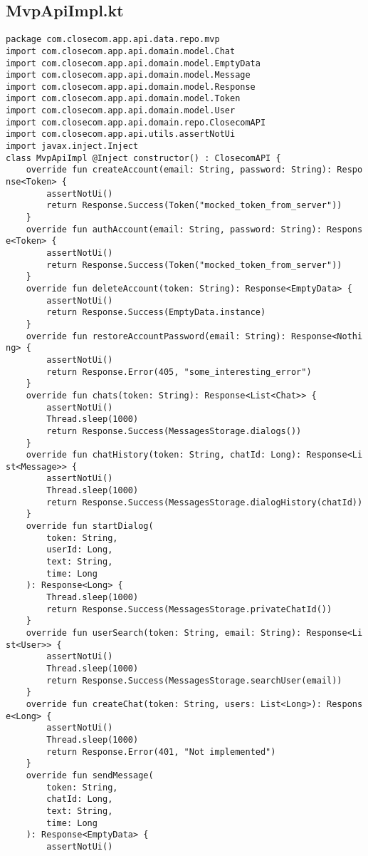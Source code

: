 \documentclass[listing]{espd}
\begin{document}
\subsection{MvpApiImpl.kt}
\begin{verbatim}
package com.closecom.app.api.data.repo.mvp
import com.closecom.app.api.domain.model.Chat
import com.closecom.app.api.domain.model.EmptyData
import com.closecom.app.api.domain.model.Message
import com.closecom.app.api.domain.model.Response
import com.closecom.app.api.domain.model.Token
import com.closecom.app.api.domain.model.User
import com.closecom.app.api.domain.repo.ClosecomAPI
import com.closecom.app.api.utils.assertNotUi
import javax.inject.Inject
class MvpApiImpl @Inject constructor() : ClosecomAPI {
    override fun createAccount(email: String, password: String): Respo
nse<Token> {
        assertNotUi()
        return Response.Success(Token("mocked_token_from_server"))
    }
    override fun authAccount(email: String, password: String): Respons
e<Token> {
        assertNotUi()
        return Response.Success(Token("mocked_token_from_server"))
    }
    override fun deleteAccount(token: String): Response<EmptyData> {
        assertNotUi()
        return Response.Success(EmptyData.instance)
    }
    override fun restoreAccountPassword(email: String): Response<Nothi
ng> {
        assertNotUi()
        return Response.Error(405, "some_interesting_error")
    }
    override fun chats(token: String): Response<List<Chat>> {
        assertNotUi()
        Thread.sleep(1000)
        return Response.Success(MessagesStorage.dialogs())
    }
    override fun chatHistory(token: String, chatId: Long): Response<Li
st<Message>> {
        assertNotUi()
        Thread.sleep(1000)
        return Response.Success(MessagesStorage.dialogHistory(chatId))
    }
    override fun startDialog(
        token: String,
        userId: Long,
        text: String,
        time: Long
    ): Response<Long> {
        Thread.sleep(1000)
        return Response.Success(MessagesStorage.privateChatId())
    }
    override fun userSearch(token: String, email: String): Response<Li
st<User>> {
        assertNotUi()
        Thread.sleep(1000)
        return Response.Success(MessagesStorage.searchUser(email))
    }
    override fun createChat(token: String, users: List<Long>): Respons
e<Long> {
        assertNotUi()
        Thread.sleep(1000)
        return Response.Error(401, "Not implemented")
    }
    override fun sendMessage(
        token: String,
        chatId: Long,
        text: String,
        time: Long
    ): Response<EmptyData> {
        assertNotUi()

\end{verbatim}
\end{document}

